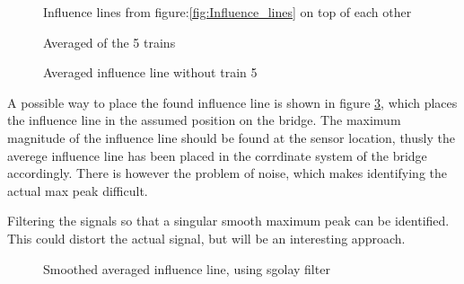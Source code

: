 \begin{figure}[H]
\centering

\caption{Influence lines from figure:\ref{fig:Influence_lines} on top of each other}
\label{fig:infl_all_trains}
\end{figure}

\begin{figure}[H]
\centering

\caption{Averaged of the 5 trains}
\label{fig:infl_vec_averaged}
\end{figure}

\begin{figure}[H]
\centering

\caption{Averaged influence line without train 5}
\label{fig:infl_vec_averaged}
\end{figure}

A possible way to place the found influence line is shown in figure \ref{fig:infl_vec_averaged}, which places the influence line in the assumed position on the bridge. The maximum magnitude of the influence line should be found at the sensor location, thusly the averege influence line has been placed in the corrdinate system of the bridge accordingly. There is however the problem of noise, which makes identifying the actual max peak difficult.

Filtering the signals so that a singular smooth maximum peak can be identified. This could distort the actual signal, but will be an interesting approach.

% 

\begin{figure}[H]
\centering

\caption{Smoothed averaged influence line, using sgolay filter}
\label{fig:infl_averaged_smoothed}
\end{figure}

